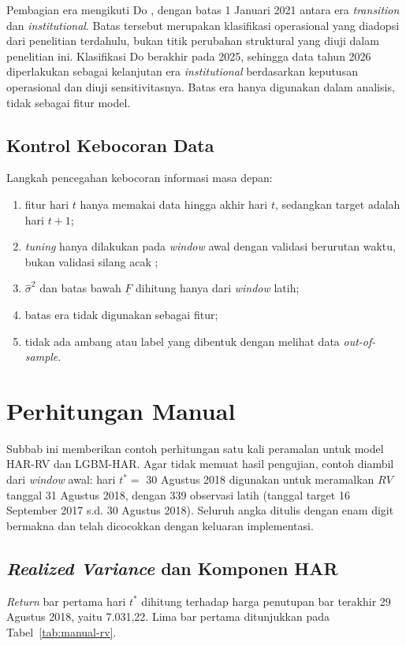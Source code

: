 Pembagian era mengikuti Do \cite{do2026}, dengan batas 1 Januari 2021 antara
era \textit{transition} dan \textit{institutional}. Batas tersebut merupakan
klasifikasi operasional yang diadopsi dari penelitian terdahulu, bukan titik
perubahan struktural yang diuji dalam penelitian ini. Klasifikasi Do berakhir
pada 2025, sehingga data tahun 2026 diperlakukan sebagai kelanjutan era
\textit{institutional} berdasarkan keputusan operasional dan diuji
sensitivitasnya. Batas era hanya digunakan dalam analisis, tidak sebagai fitur
model.

\subsection{Kontrol Kebocoran Data}
Langkah pencegahan kebocoran informasi masa depan:
\begin{enumerate}
  \item fitur hari $t$ hanya memakai data hingga akhir hari $t$, sedangkan
        target adalah hari $t+1$;
  \item \textit{tuning} hanya dilakukan pada \textit{window} awal dengan
        validasi berurutan waktu, bukan validasi silang acak
        \cite{cerqueira2020};
  \item $\hat\sigma^2$ dan batas bawah $\underline{F}$ dihitung hanya dari
        \textit{window} latih;
  \item batas era tidak digunakan sebagai fitur;
  \item tidak ada ambang atau label yang dibentuk dengan melihat data
        \textit{out-of-sample}.
\end{enumerate}

\section{Perhitungan Manual}
Subbab ini memberikan contoh perhitungan satu kali peramalan untuk model
HAR-RV dan LGBM-HAR. Agar tidak memuat hasil pengujian, contoh diambil dari
\textit{window} awal: hari $t^* = $ 30 Agustus 2018 digunakan untuk meramalkan
$RV$ tanggal 31 Agustus 2018, dengan 339 observasi latih (tanggal target
16 September 2017 s.d. 30 Agustus 2018). Seluruh angka ditulis dengan enam
digit bermakna dan telah dicocokkan dengan keluaran implementasi.

\subsection{\textit{Realized Variance} dan Komponen HAR}
\label{subsec:manual-rv}
\textit{Return} bar pertama hari $t^*$ dihitung terhadap harga penutupan bar
terakhir 29 Agustus 2018, yaitu 7.031,22. Lima bar pertama ditunjukkan pada
Tabel~\ref{tab:manual-rv}.

